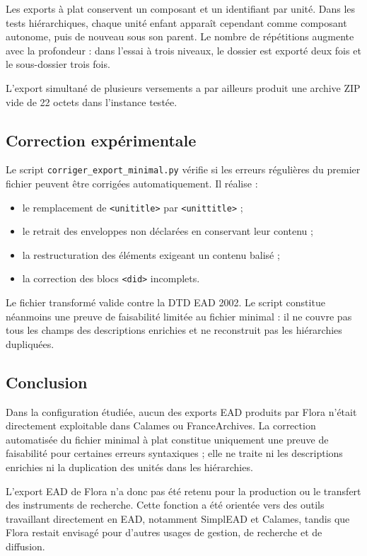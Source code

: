 Les exports à plat conservent un composant et un identifiant par unité. Dans les tests hiérarchiques, chaque unité enfant apparaît cependant comme composant autonome, puis de nouveau sous son parent. Le nombre de répétitions augmente avec la profondeur : dans l'essai à trois niveaux, le dossier est exporté deux fois et le sous-dossier trois fois.

L'export simultané de plusieurs versements a par ailleurs produit une archive ZIP vide de 22 octets dans l'instance testée.

\subsection{Correction expérimentale}

Le script \texttt{corriger\_export\_minimal.py} vérifie si les erreurs régulières du premier fichier peuvent être corrigées automatiquement. Il réalise :

\begin{itemize}
	\item le remplacement de \texttt{<unititle>} par \texttt{<unittitle>} ;
	\item le retrait des enveloppes non déclarées en conservant leur contenu ;
	\item la restructuration des éléments exigeant un contenu balisé ;
	\item la correction des blocs \texttt{<did>} incomplets.
\end{itemize}

Le fichier transformé valide contre la DTD EAD 2002. Le script constitue néanmoins une preuve de faisabilité limitée au fichier minimal : il ne couvre pas tous les champs des descriptions enrichies et ne reconstruit pas les hiérarchies dupliquées.

\subsection{Conclusion}

Dans la configuration étudiée, aucun des exports EAD produits par Flora n'était directement exploitable dans Calames ou FranceArchives. La correction automatisée du fichier minimal à plat constitue uniquement une preuve de faisabilité pour certaines erreurs syntaxiques ; elle ne traite ni les descriptions enrichies ni la duplication des unités dans les hiérarchies.

L'export EAD de Flora n'a donc pas été retenu pour la production ou le transfert des instruments de recherche. Cette fonction a été orientée vers des outils travaillant directement en EAD, notamment SimplEAD et Calames, tandis que Flora restait envisagé pour d'autres usages de gestion, de recherche et de diffusion.

